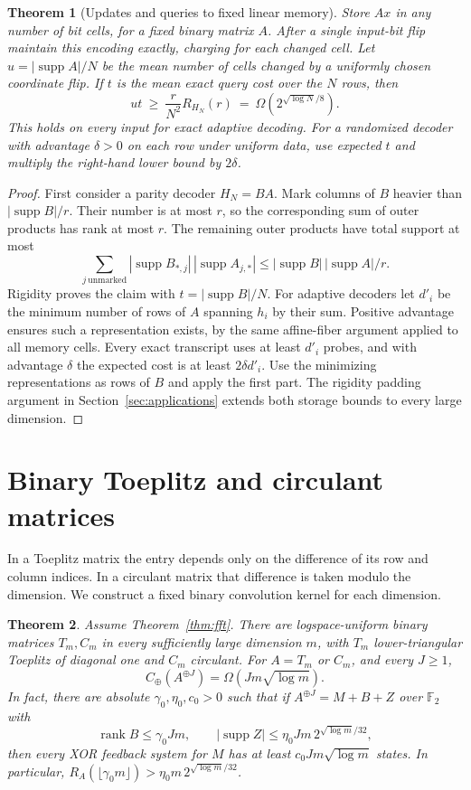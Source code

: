 \documentclass[11pt]{article}
\newtheorem{theorem}{Theorem}[section]
\theoremstyle{definition}
\theoremstyle{remark}
\newcommand{\F}{\mathbb{F}}
\newcommand{\Cx}{C_{\oplus}}
\newcommand{\supp}{\operatorname{supp}}
\newcommand{\rk}{\operatorname{rank}}
\begin{document}
\begin{theorem}[Updates and queries to fixed linear memory]\label{thm:dynamic}
Store $Ax$ in any number of bit cells, for a fixed binary matrix $A$.
After a single input-bit flip maintain this encoding exactly, charging
for each changed cell. Let $u=|\supp A|/N$ be the mean number of cells
changed by a uniformly chosen coordinate flip. If $t$ is the mean
exact query cost over the $N$ rows, then
\[
 ut\ \ge\ \frac{r}{N^2} R_{H_N}(r)
 \ =\ \Omega\!\left(2^{\sqrt{\log N}/8}\right).
\]
This holds on every input for exact adaptive decoding. For a randomized
decoder with advantage $\delta>0$ on each row under uniform data, use
expected $t$ and multiply the right-hand lower bound by $2\delta$.
\end{theorem}
\begin{proof}
First consider a parity decoder $H_N=BA$. Mark columns of $B$ heavier
than $|\supp B|/r$. Their number is at most $r$, so the corresponding
sum of outer products has rank at most $r$. The remaining outer
products have total support at most
\[
 \sum_{j\ \mathrm{unmarked}} |\supp B_{*,j}|\,|\supp A_{j,*}|
 \le |\supp B|\,|\supp A|/r .
\]
Rigidity proves the claim with $t=|\supp B|/N$.
For adaptive decoders let $d'_i$ be the minimum number of rows of
$A$ spanning $h_i$ by their sum. Positive advantage ensures such a
representation exists, by the same affine-fiber argument applied to
all memory cells. Every exact transcript uses at least $d'_i$ probes,
and with advantage $\delta$ the expected cost is at least $2\delta d'_i$.
Use the minimizing representations as rows of $B$ and apply the first
part. The rigidity padding argument in Section~\ref{sec:applications}
extends both storage bounds to every large dimension.
\end{proof}

\section{Binary Toeplitz and circulant matrices}\label{sec:toeplitz}

In a Toeplitz matrix the entry depends only on the difference of its
row and column indices. In a circulant matrix that difference is
taken modulo the dimension. We construct a fixed binary convolution
kernel for each dimension.

\begin{theorem}\label{thm:toeplitz}
Assume Theorem~\ref{thm:fft}. There are logspace-uniform binary
matrices $T_m,C_m$ in every sufficiently large dimension $m$, with
$T_m$ lower-triangular Toeplitz of diagonal one and $C_m$ circulant.
For $A=T_m$ or $C_m$, and every $J\ge1$,
\[
                         \Cx(A^{\oplus J})=\Omega(Jm\sqrt{\log m}).
\]
In fact, there are absolute $\gamma_0,\eta_0,c_0>0$ such that if
$A^{\oplus J}=M+B+Z$ over $\F_2$ with
\[
   \rk B\le\gamma_0 Jm,\qquad
   |\supp Z|\le\eta_0 Jm\,2^{\sqrt{\log m}/32},
\]
then every XOR feedback system for $M$ has at least
$c_0Jm\sqrt{\log m}$ states. In particular,
$R_A(\lfloor\gamma_0m\rfloor)>\eta_0m\,2^{\sqrt{\log m}/32}$.
\end{theorem}
\end{document}
